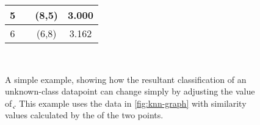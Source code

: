 \begin{figure}
{\begin{tabular}{|c|c|c|c|}
  \rowcolor{\bcolor}  5    & \bchar{}      & (8,5) & 3.000       \\ \hline
  \rowcolor{\bcolor}  6    & \bchar{}      & (6,8) & 3.162       \\ \hline
\end{tabular}
}
\\
\caption{A simple \kNNlong{} example, showing how the resultant classification of an unknown-class datapoint can change simply by adjusting the value of \k{}. This example uses the data in \autoref{fig:knn-graph} with similarity values calculated by the \euclid{} of the two points.}
\label{fig:knn}
\end{figure}